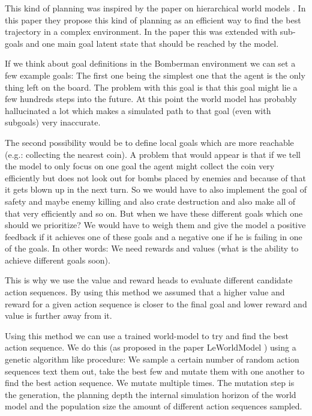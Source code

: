 \documentclass[article, 10pt]{IEEEtran}
\begin{document}
This kind of planning was inspired by the paper on hierarchical world models \cite{zhang2026hwm}. In this paper they propose this kind of planning as an efficient way to find the best trajectory in a complex environment. In the paper this was extended with sub-goals and one main goal latent state that should be reached by the model. 

If we think about goal definitions in the Bomberman environment we can set a few example goals: The first one being the simplest one that the agent is the only thing left on the board. The problem with this goal is that this goal might lie a few hundreds steps into the future. At this point the world model has probably hallucinated a lot which makes a simulated path to that goal (even with subgoals) very inaccurate. 

The second possibility would be to define local goals which are more reachable (e.g.: collecting the nearest coin). A problem that would appear is that if we tell the model to only focus on one goal the agent might collect the coin very efficiently but does not look out for bombs placed by enemies and because of that it gets blown up in the next turn. So we would have to also implement the goal of safety and maybe enemy killing and also crate destruction and also make all of that very efficiently and so on. But when we have these different goals which one should we prioritize? We would have to weigh them and give the model a positive feedback if it achieves one of these goals and a negative one if he is failing in one of the goals. In other words: We need rewards and values (what is the ability to achieve different goals soon). 

This is why we use the value and reward heads to evaluate different candidate action sequences. By using this method we assumed that a higher value and reward for a given action sequence is closer to the final goal and lower reward and value is further away from it.

Using this method we can use a trained world-model to try and find the best action sequence. We do this (as proposed in the paper LeWorldModel \cite{maes2026leworldmodelstableendtoendjointembedding}) using a genetic algorithm like procedure: We sample a certain number of random action sequences text them out, take the best few and mutate them with one another to find the best action sequence. We mutate multiple times. The mutation step is the generation, the planning depth the internal simulation horizon of the world model and the population size the amount of different action sequences sampled.
\end{document}
